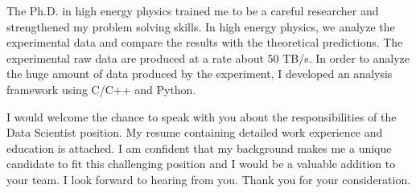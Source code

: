 \documentclass[11pt,letterpaper]{moderncv}   %
\newcommand{\JobPositionName}{Data Scientist}
\begin{document}
The Ph.D. in high energy physics trained me to be a careful researcher and strengthened my problem solving skills.
In high energy physics, we analyze the experimental data and compare the results with the theoretical predictions.
The experimental raw data are produced at a rate about 50 TB/s.
In order to analyze the huge amount of data produced by the experiment, I developed an analysis framework using C/C++ and Python.


I would welcome the chance to speak with you about the responsibilities of the \JobPositionName{} position.
My resume containing detailed work experience and education is attached.
I am confident that my background makes me a unique candidate to fit this challenging position and I would be a valuable addition to your team.
I look forward to hearing from you.
Thank you for your consideration.


\vspace{0.01cm}

\makeletterclosing
\end{document}
